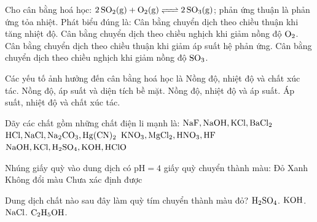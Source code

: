 \documentclass[12pt,a4paper]{article}
\begin{document}
\begin{ex}
Cho cân bằng hoá học: $\ce{2SO2(g) + O2(g) <=> 2SO3(g)}$; phản ứng thuận là phản ứng tỏa nhiệt. Phát biểu đúng là:
\choice
{Cân bằng chuyển dịch theo chiều thuận khi tăng nhiệt độ.}
{\True Cân bằng chuyển dịch theo chiều nghịch khi giảm nồng độ $\ce{O2}$.}
{Cân bằng chuyển dịch theo chiều thuận khi giảm áp suất hệ phản ứng.}
{Cân bằng chuyển dịch theo chiều nghịch khi giảm nồng độ $\ce{SO3}$.}
\end{ex}

\begin{ex}
Các yếu tố ảnh hưởng đến cân bằng hoá học là
\choice
{Nồng độ, nhiệt độ và chất xúc tác.}
{Nồng độ, áp suất và diện tích bề mặt.}
{\True Nồng độ, nhiệt độ và áp suất.}
{Áp suất, nhiệt độ và chất xúc tác.}
\end{ex}

\begin{ex}
Dãy các chất gồm những chất điện li mạnh là:
\choice
{\True $\ce{NaF, NaOH, KCl, BaCl2}$}
{$\ce{HCl, NaCl, Na2CO3, Hg(CN)2}$}
{$\ce{KNO3, MgCl2, HNO3, HF}$}
{$\ce{NaOH, KCl, H2SO4, KOH, HClO}$}
\end{ex}

\begin{ex}
Nhúng giấy quỳ vào dung dịch có $\text{pH} = 4$ giấy quỳ chuyển thành màu:
\choice
{\True Đỏ}
{Xanh}
{Không đổi màu}
{Chưa xác định được}
\end{ex}

\begin{ex}
Dung dịch chất nào sau đây làm quỳ tím chuyển thành màu đỏ?
\choice
{\True $\ce{H2SO4}$.}
{$\ce{KOH}$.}
{$\ce{NaCl}$.}
{$\ce{C2H5OH}$.}
\end{ex}
\end{document}
